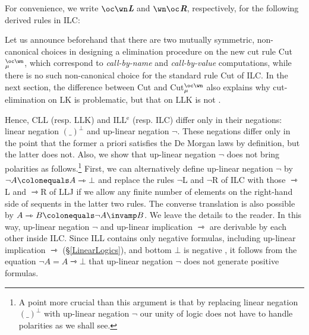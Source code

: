 \documentclass[a4paper]{article}
\theoremstyle{definition}
\theoremstyle{theorem}
\theoremstyle{remark}
\begin{document}
For convenience, we write \emph{\bfseries $\boldsymbol{\oc\wn}$L} and \emph{\bfseries $\boldsymbol{\wn\oc}$R}, respectively, for the following derived rules in \textsf{ILC}:
\fi

Let us announce beforehand that there are two mutually symmetric, non-canonical choices in designing a elimination procedure on the new cut rule Cut$^{\oc\wn}_\mu$, which correspond to \emph{call-by-name} and \emph{call-by-value} computations, while there is no such non-canonical choice for the standard rule Cut of \textsf{ILC}.
In the next section, the difference between Cut and Cut$^{\oc\wn}_\mu$ also explains why cut-elimination on \textsf{LK} is problematic, but that on \textsf{LLK} is not \cite{girard1989proofs}.
\fi

Hence, CLL (resp. \textsf{LLK}) and ILL$^{\text{e}}$ (resp. \textsf{ILC}) differ only in their negations: linear negation $(\_)^\bot$ and up-linear negation $\neg$.
These negations differ only in the point that the former a priori satisfies the De Morgan laws by definition, but the latter does not.
Also, we show that up-linear negation $\neg$ does not bring polarities as follows.\footnote{A point more crucial than this argument is that by replacing linear negation $(\_)^\bot$ with up-linear negation $\neg$ our unity of logic does not have to handle polarities as we shall see.}
First, we can alternatively define up-linear negation $\neg$ by $\neg A \colonequals A \rightarrowtriangle \bot$ and replace the rules $\neg$L and $\neg$R of \textsf{ILC} with those $\rightarrowtriangle$L and $\rightarrowtriangle$R of \textsf{LLJ} if we allow any finite number of elements on the right-hand side of sequents in the latter two rules.
The converse translation is also possible by $A \rightarrowtriangle B \colonequals \neg A \invamp B$.
We leave the details to the reader.
In this way, up-linear negation $\neg$ and up-linear implication $\rightarrowtriangle$ are derivable by each other inside \textsf{ILC}.
Since ILL contains only negative formulas, including up-linear implication $\rightarrowtriangle$ (\S\ref{LinearLogics}), and bottom $\bot$ is negative \cite{girard1993unity}, it follows from the equation $\neg A = A \rightarrowtriangle \bot$ that up-linear negation $\neg$ does not generate positive formulas.
\end{document}
